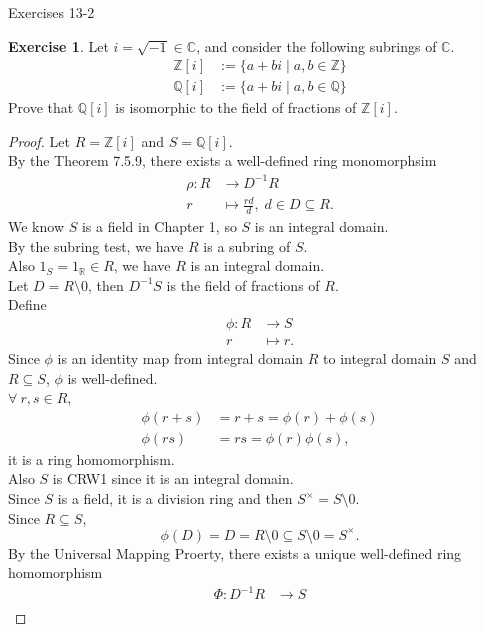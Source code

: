 \documentclass{article}
\newcommand{\bbr}{\mathbb{R}}
\newcommand{\bbc}{\mathbb{C}}
\newcommand{\bbz}{\mathbb{Z}}
\newcommand{\bbq}{\mathbb{Q}}
\theoremstyle{plain}
\theoremstyle{definition}
\newtheorem{exer}[lem]{Exercise}
\begin{document}
\newpage
\noindent Exercises 13-2\\
\begin{exer}
Let $i=\sqrt{-1}\in\bbc$, and consider the following subrings of $\bbc$.
\begin{align*}
\bbz[i]&:=\{a+bi\mid a,b\in\bbz\}
\\
\bbq[i]&:=\{a+bi\mid a,b\in\bbq\}
\end{align*}
Prove that $\bbq[i]$ is isomorphic to the field of fractions of $\bbz[i]$.
\begin{proof}
    Let $R = \bbz[i]$ and $S = \bbq[i]$.\\
    By the Theorem 7.5.9, there exists a well-defined ring monomorphsim 
    \begin{align*}
        \rho: R &\to D^{-1}R \\
        r &\mapsto \frac{rd}{d} ,\; d\in D\subseteq R.
    \end{align*}
    We know $S$ is a field in Chapter 1, so $S$ is an integral domain.\\
    By the subring test, we have $R$ is a subring of $S$.\\
    Also $1_S = 1_\bbr \in R$, we have $R$ is an integral domain.\\
    Let $D = R\setminus 0$, then $D^{-1}S$ is the field of fractions of $R$.\\
   Define
   \begin{align*}
       \phi: R &\to S \\
             r &\mapsto r.
   \end{align*}
   Since $\phi$ is an identity map from integral domain $R$ to integral domain $S$ and  $R \subseteq S$, $\phi$ is well-defined.\\
   $\forall \ r,s \in R$,
   \begin{align*}
       \phi(r+s) &= r+s = \phi(r) +\phi(s)\\
       \phi(rs) &=rs = \phi(r)\phi(s),
   \end{align*}
   it is a ring homomorphism.\\
   Also $S$ is CRW1 since it is an integral domain.\\
   Since $S$ is a field, it is a division ring and then $S^{\times} = S\setminus 0$.\\
   Since $R \subseteq S$,
   \[\phi(D) = D = R\setminus 0 \subseteq S\setminus 0 = S^{\times}.\]    By the Universal Mapping Proerty, there exists a unique well-defined ring homomorphism 
   \begin{align*}
       \Phi:D^{-1}R &\to S\\

\end{align*}
\end{proof}
\end{exer}
\end{document}
